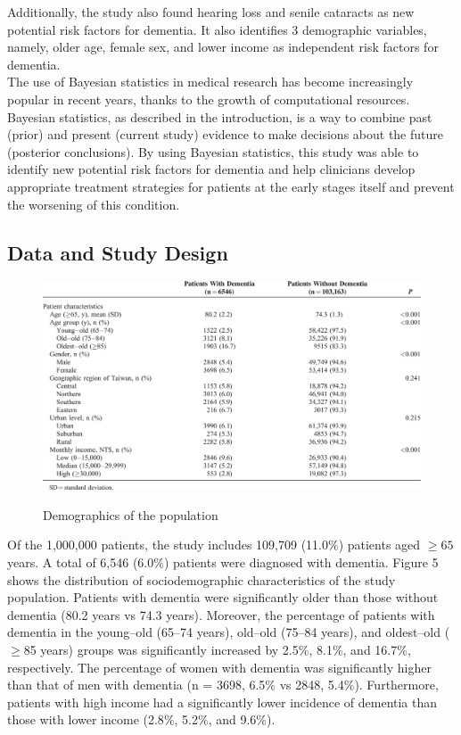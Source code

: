 \documentclass[12pt,letterpaper]{article}
\begin{document}
Additionally, the study also found hearing loss and senile cataracts as new potential risk factors for dementia. It also identifies $3$ demographic variables, namely, older age, female sex, and lower income as independent risk factors for dementia. \\

The use of Bayesian statistics in medical research has become increasingly popular in recent years, thanks to the growth of computational resources. Bayesian statistics, as described in the introduction, is a way to combine past (prior) and present (current study) evidence to make decisions about the future (posterior conclusions). By using Bayesian statistics, this study was able to identify new potential risk factors for dementia and help clinicians develop appropriate treatment strategies for patients at the early stages itself and prevent the worsening of this condition.

\subsection{Data and Study Design}
\begin{figure}[t]
\centering
\includegraphics[width=1\linewidth]{bayesian_table1.jpeg}
\label{fig:bayesian_table1}
\caption{Demographics of the population}
\end{figure}

Of the 1,000,000 patients, the study includes 109,709 (11.0$\%$) patients aged $\geq 65$ years. A total of 6,546 (6.0$\%$) patients were diagnosed with dementia. Figure 5 shows the distribution of sociodemographic characteristics of the study population. Patients with dementia were significantly older than those without dementia (80.2 years vs 74.3 years). Moreover, the percentage of patients with dementia in the young–old (65–74 years), old–old (75–84 years), and oldest–old ($\geq$85 years) groups was significantly increased by 2.5$\%$, 8.1$\%$, and 16.7$\%$, respectively. The percentage of women with dementia was significantly higher than that of men with dementia (n = 3698, 6.5$\%$ vs 2848, 5.4$\%$). Furthermore, patients with high income had a significantly lower incidence of dementia than those with lower income (2.8$\%$, 5.2$\%$, and 9.6$\%$). \\
\end{document}

